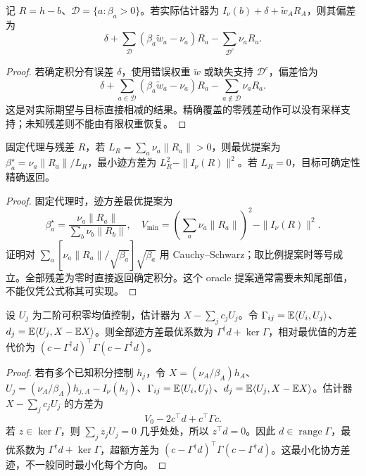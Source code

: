 \begin{proposition}
记 $R=h-b$、$\mathcal D=\{a:\beta_a>0\}$。若实际估计器为 $I_\nu(b)+\delta+\widetilde w_AR_A$，则其偏差为
\begin{equation}
\delta+\sum_{\mathcal D}(\beta_a\widetilde w_a-\nu_a)R_a
-\sum_{\mathcal D^c}\nu_aR_a.
\end{equation}
\end{proposition}
\begin{proof}
若确定积分有误差 $\delta$，使用错误权重 $\widetilde w$ 或缺失支持 $\mathcal D^c$，偏差恰为
\begin{equation}
\delta+\sum_{a\in\mathcal D}(\beta_a\widetilde w_a-\nu_a)R_a
-\sum_{a\notin\mathcal D}\nu_aR_a.
\end{equation}
这是对实际期望与目标直接相减的结果。精确覆盖的零残差动作可以没有采样支持；未知残差则不能由有限权重恢复。
\end{proof}

\begin{proposition}[固定残差下的迹方差最优提案]
固定代理与残差 $R$，若 $L_R=\sum_a\nu_a\|R_a\|>0$，则最优提案为 $\beta_a^\star=\nu_a\|R_a\|/L_R$，最小迹方差为 $L_R^2-\|I_\nu(R)\|^2$。若 $L_R=0$，目标可确定性精确返回。
\end{proposition}
\begin{proof}
固定代理时，迹方差最优提案为
\begin{equation}
\beta_a^\star=\frac{\nu_a\|R_a\|}{\sum_b\nu_b\|R_b\|},\quad
V_{\min}=\left(\sum_a\nu_a\|R_a\|\right)^2-\|I_\nu(R)\|^2.
\end{equation}
证明对 $\sum_a[\nu_a\|R_a\|/\sqrt{\beta_a}]\sqrt{\beta_a}$ 用 Cauchy--Schwarz；取比例提案时等号成立。全部残差为零时直接返回确定积分。这个 oracle 提案通常需要未知尾部值，不能仅凭公式称其可实现。
\end{proof}

\begin{theorem}
设 $U_j$ 为二阶可积零均值控制，估计器为 $X-\sum_jc_jU_j$。令 $\Gamma_{ij}=\mathbb E\langle U_i,U_j\rangle$、$d_j=\mathbb E\langle U_j,X-\mathbb E X\rangle$。则全部迹方差最优系数为 $\Gamma^\dagger d+\ker\Gamma$，相对最优值的方差代价为 $(c-\Gamma^\dagger d)^\top\Gamma(c-\Gamma^\dagger d)$。
\end{theorem}
\begin{proof}
若有多个已知积分控制 $h_j$，令 $X=(\nu_A/\beta_A)h_A$、$U_j=(\nu_A/\beta_A)h_{j,A}-I_\nu(h_j)$、$\Gamma_{ij}=\mathbb E\langle U_i,U_j\rangle$、$d_j=\mathbb E\langle U_j,X-\mathbb E X\rangle$。估计器 $X-\sum_jc_jU_j$ 的方差为
\begin{equation}
V_0-2c^\top d+c^\top\Gamma c.
\end{equation}
若 $z\in\ker\Gamma$，则 $\sum_jz_jU_j=0$ 几乎处处，所以 $z^\top d=0$。因此 $d\in\operatorname{range}\Gamma$，最优系数为 $\Gamma^\dagger d+\ker\Gamma$，超额方差为 $(c-\Gamma^\dagger d)^\top\Gamma(c-\Gamma^\dagger d)$。这最小化协方差迹，不一般同时最小化每个方向。
\end{proof}

